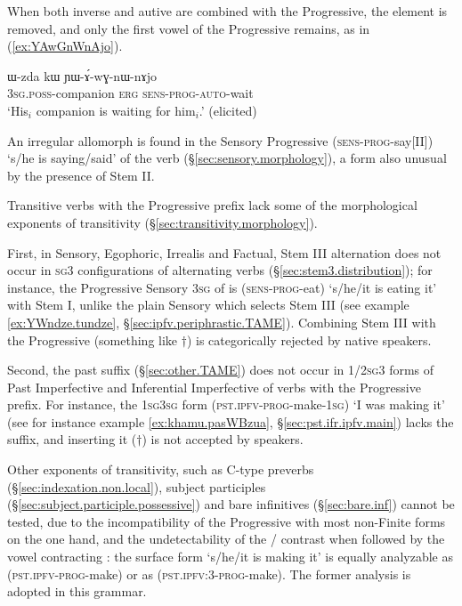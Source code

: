 When both inverse and autive are combined with the Progressive, the  element is removed, and only the first vowel of the Progressive remains, as in (\ref{ex:YAwGnWnAjo}).

\begin{exe}
\ex \label{ex:YAwGnWnAjo}
\gll ɯ-zda kɯ ɲɯ-ɤ́-wɣ-nɯ-nɤjo \\
\textsc{3sg}.\textsc{poss}-companion \textsc{erg} \textsc{sens}-\textsc{prog}-\textsc{auto}-wait \\
\glt `His$_i$ companion is waiting for him$_i$.' (elicited)
\end{exe} 

An irregular allomorph  is found in the Sensory Progressive  (\textsc{sens}-\textsc{prog}-say[II])  `s/he is saying/said' of the verb   (§\ref{sec:sensory.morphology}), a form also unusual by the presence of Stem II.

Transitive verbs with the Progressive prefix lack some of the morphological exponents of transitivity (§\ref{sec:transitivity.morphology}). 

First, in Sensory, Egophoric, Irrealis and Factual, Stem III alternation does not occur in \textsc{sg}\fl{}3 configurations of alternating verbs (§\ref{sec:stem3.distribution}); for instance, the Progressive Sensory \textsc{3sg}\flobv{} of  is  (\textsc{sens}-\textsc{prog}-eat) `s/he/it is eating it' with Stem I, unlike the plain Sensory  which selects Stem III (see example \ref{ex:YWndze.tundze}, §\ref{sec:ipfv.periphrastic.TAME}). Combining Stem III with the Progressive (something like $\dagger$) is categorically rejected by native speakers. 

Second, the past  suffix (§\ref{sec:other.TAME}) does not occur in 1/2\textsc{sg}\fl{}3 forms of Past Imperfective and Inferential Imperfective of verbs with the Progressive prefix. For instance, the \textsc{1sg}\fl{}\textsc{3sg} form  (\textsc{pst}.\textsc{ipfv}-\textsc{prog}-make-\textsc{1sg}) `I was making it' (see for instance example \ref{ex:khamu.pasWBzua}, §\ref{sec:pst.ifr.ipfv.main}) lacks the  suffix, and inserting it ($\dagger$) is not accepted by speakers. 

Other exponents of transitivity, such as C-type preverbs (§\ref{sec:indexation.non.local}), subject participles (§\ref{sec:subject.participle.possessive}) and bare infinitives (§\ref{sec:bare.inf}) cannot be tested, due to the incompatibility of the Progressive with most non-Finite forms on the one hand, and the undetectability of the / contrast when followed by the vowel contracting : the surface form  `s/he/it is making it' is equally analyzable as  (\textsc{pst}.\textsc{ipfv}-\textsc{prog}-make) or as  (\textsc{pst}.\textsc{ipfv}:3\flobv{}-\textsc{prog}-make). The former analysis is adopted in this grammar.

